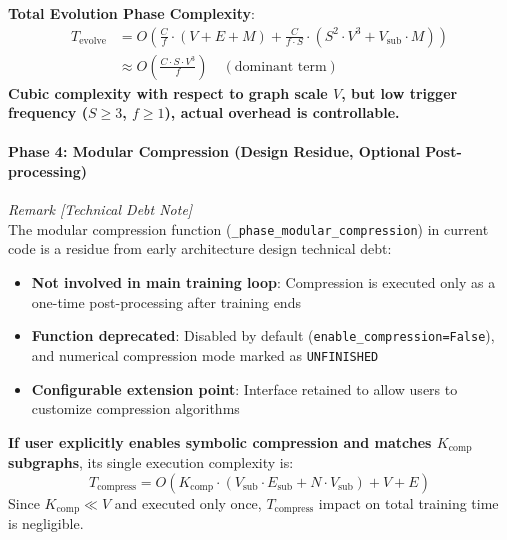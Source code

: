 \textbf{Total Evolution Phase Complexity}:
\begin{equation}
\begin{aligned}
    T_{\mathrm{evolve}} &= O\left( \frac{C}{f} \cdot (V + E + M) + \frac{C}{f \cdot S} \cdot (S^2 \cdot V^3 + V_{\mathrm{sub}} \cdot M) \right) \\
    &\approx O\left(\frac{C \cdot S \cdot V^3}{f}\right) \quad (\text{dominant term})
\end{aligned}
\end{equation}
\textbf{Cubic complexity with respect to graph scale $V$, but low trigger frequency ($S \geq 3$, $f \geq 1$), actual overhead is controllable.}

\paragraph{Phase 4: Modular Compression (Design Residue, Optional Post-processing)}
\textit{Remark [Technical Debt Note]} \\
The modular compression function (\texttt{\_phase\_modular\_compression}) in current code is a residue from early architecture design technical debt:
\begin{itemize}
    \item \textbf{Not involved in main training loop}: Compression is executed only as a one-time post-processing after training ends
    \item \textbf{Function deprecated}: Disabled by default (\texttt{enable\_compression=False}), and numerical compression mode marked as \texttt{UNFINISHED}
    \item \textbf{Configurable extension point}: Interface retained to allow users to customize compression algorithms
\end{itemize}

\textbf{If user explicitly enables symbolic compression and matches $K_{\mathrm{comp}}$ subgraphs}, its single execution complexity is:
\begin{equation}
    T_{\mathrm{compress}} = O\left( K_{\mathrm{comp}} \cdot (V_{\mathrm{sub}} \cdot E_{\mathrm{sub}} + N \cdot V_{\mathrm{sub}}) + V + E \right)
\end{equation}
Since $K_{\mathrm{comp}} \ll V$ and executed only once, $T_{\mathrm{compress}}$ impact on total training time is negligible.

